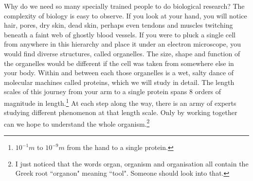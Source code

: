 Why do we need so many specially trained people to do biological research? The complexity of biology is easy to observe. If you look at your hand, you will notice hair, pores, dry skin, dead skin, perhaps even tendons and muscles twitching beneath a faint web of ghostly blood vessels. If you were to pluck a single cell from anywhere in this hierarchy and place it under an electron microscope, you would find diverse structures, called organelles. The size, shape and function of the organelles would be different if the cell was taken from somewhere else in your body. Within and between each those organelles is a wet, salty dance of molecular machines called proteins, which we will study in detail. The length scales of this journey from your arm to a single protein spans 8 orders of magnitude in length.\footnote{$10^{-1}m$  to $10^{-9}m$ from the hand to a single protein.} At each step along the way, there is an army of experts studying different phenomenon at that length scale. Only by working together can we hope to understand the whole organism.\footnote{I just noticed that the words organ, organism and organisation all contain the Greek root ``organon" meaning ``tool". Someone should look into that. }

